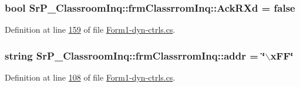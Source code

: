 \hypertarget{class_sr_p___classroom_inq_1_1frm_classrrom_inq_a65b6633a5bc7bff8142fcace6bfba3f8}{
\subsubsection[{\-Ack\-R\-Xd}]{\setlength{\rightskip}{0pt plus 5cm}bool {\bf \-Sr\-P\-\_\-\-Classroom\-Inq\-::frm\-Classrrom\-Inq\-::\-Ack\-R\-Xd} = false}}
\label{class_sr_p___classroom_inq_1_1frm_classrrom_inq_a65b6633a5bc7bff8142fcace6bfba3f8}


\-Definition at line \hyperlink{_form1-dyn-ctrls_8cs_source_l00159}{159} of file \hyperlink{_form1-dyn-ctrls_8cs_source}{\-Form1-\/dyn-\/ctrls.\-cs}.

\hypertarget{class_sr_p___classroom_inq_1_1frm_classrrom_inq_ab99245163109493292f36ab5011c4f76}{
\subsubsection[{addr}]{\setlength{\rightskip}{0pt plus 5cm}string {\bf \-Sr\-P\-\_\-\-Classroom\-Inq\-::frm\-Classrrom\-Inq\-::addr} = \char`\"{}$\backslash$x\-F\-F\char`\"{}}}
\label{class_sr_p___classroom_inq_1_1frm_classrrom_inq_ab99245163109493292f36ab5011c4f76}


\-Definition at line \hyperlink{_form1-dyn-ctrls_8cs_source_l00108}{108} of file \hyperlink{_form1-dyn-ctrls_8cs_source}{\-Form1-\/dyn-\/ctrls.\-cs}.

